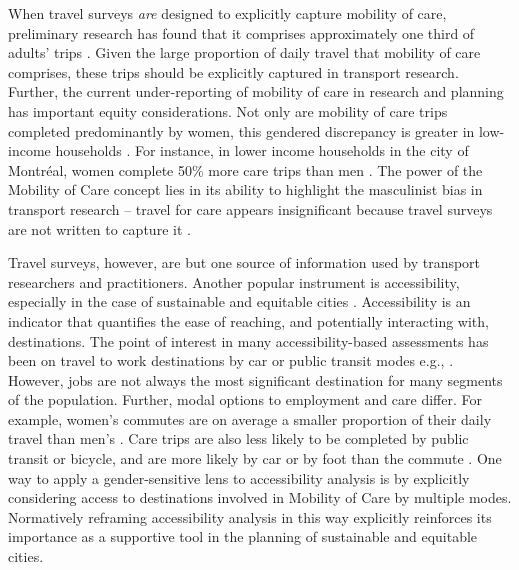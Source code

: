 \documentclass[
  authoryear,
  preprint,
  3p]{elsarticle}
\begin{document}
When travel surveys \emph{are} designed to explicitly capture mobility
of care, preliminary research has found that it comprises approximately
one third of adults' trips
\citep{gomezvaroAccountingCareEveryday2023, sanchezdemadariagaMobilityCareIntroducing2013, sanchezdemadariagaMeasuringMobilitiesCare2019, ravensbergenExploratoryAnalysisMobility2022}.
Given the large proportion of daily travel that mobility of care
comprises, these trips should be explicitly captured in transport
research. Further, the current under-reporting of mobility of care in
research and planning has important equity considerations. Not only are
mobility of care trips completed predominantly by women, this gendered
discrepancy is greater in low-income households
\citep{murillomunarCaregiversMoveGender2023, sanchezdemadariagaMobilityCareIntroducing2013, ravensbergenExploratoryAnalysisMobility2022}.
For instance, in lower income households in the city of Montréal, women
complete 50\% more care trips than men
\citep{ravensbergenExploratoryAnalysisMobility2022}. The power of the
Mobility of Care concept lies in its ability to highlight the
masculinist bias in transport research -- travel for care appears
insignificant because travel surveys are not written to capture it
\citep{sanchezdemadariagaMobilityCareIntroducing2013}.

Travel surveys, however, are but one source of information used by
transport researchers and practitioners. Another popular instrument is
accessibility, especially in the case of sustainable and equitable
cities
\citep{ryanAccessibilitySpaceTime2023, bertoliniSustainableAccessibilityConceptual2005}.
Accessibility is an indicator that quantifies the ease of reaching, and
potentially interacting with, destinations. The point of interest in
many accessibility-based assessments has been on travel to work
destinations by car or public transit modes e.g.,
\citep{kelobonyeRelativeAccessibilityAnalysis2019, farberOntarioLineSocioeconomic2019, duarteInfluenceJobAccessibility2023, ryanAccessibilitySpaceTime2023, soukhovMultimodalSpatialAvailability2024}.
However, jobs are not always the most significant destination for many
segments of the population. Further, modal options to employment and
care differ. For example, women's commutes are on average a smaller
proportion of their daily travel than men's
\citep{ravensbergenExploratoryAnalysisMobility2022}. Care trips are also
less likely to be completed by public transit or bicycle, and are more
likely by car or by foot than the commute
\citep{ravensbergenExploratoryAnalysisMobility2022}. One way to apply a
gender-sensitive lens to accessibility analysis is by explicitly
considering access to destinations involved in Mobility of Care by
multiple modes. Normatively reframing accessibility analysis in this way
explicitly reinforces its importance as a supportive tool in the
planning of sustainable and equitable cities.
\end{document}
